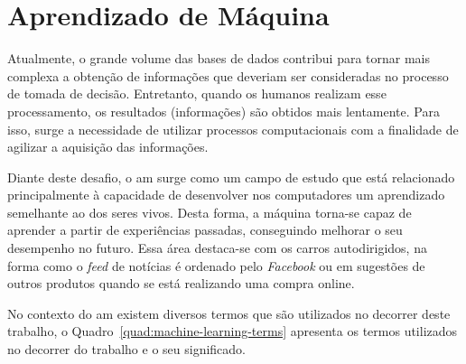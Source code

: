 \section{Aprendizado de Máquina}
    \label{sec:machine-learning}
    
    Atualmente, o grande volume das bases de dados contribui para tornar mais complexa a obtenção de informações que deveriam ser consideradas no processo de tomada de decisão. Entretanto, quando os humanos realizam esse processamento, os resultados (informações) são obtidos mais lentamente. Para isso, surge a necessidade de utilizar processos computacionais com a finalidade de agilizar a aquisição das informações.
    
    Diante deste desafio, o \ac{am} surge como um campo de estudo que está relacionado principalmente à capacidade de desenvolver nos computadores um aprendizado semelhante ao dos seres vivos. Desta forma, a máquina torna\hyp{se} capaz de aprender a partir de experiências passadas, conseguindo melhorar o seu desempenho no futuro. Essa área destaca\hyp{se} com os carros autodirigidos, na forma como o \textit{feed} de notícias é ordenado pelo \textit{Facebook} ou em sugestões de outros produtos quando se está realizando uma compra online.
    
    
    
    No contexto do \ac{am} existem diversos termos que são utilizados no decorrer deste trabalho, o Quadro~\ref{quad:machine-learning-terms} apresenta os termos utilizados no decorrer do trabalho e o seu significado.
    
    
